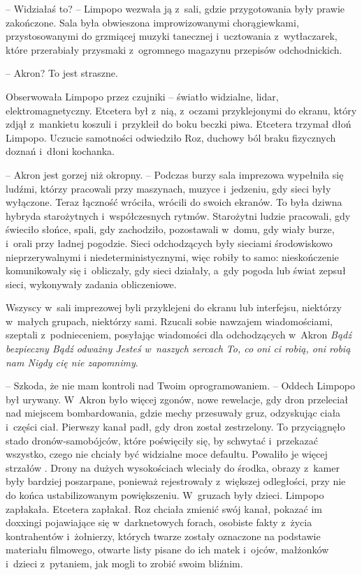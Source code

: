\documentclass[oneside,polish,11pt,sfheadings]{mwbk}
\begin{document}
-- Widziałaś to? -- Limpopo wezwała ją z~sali, gdzie przygotowania były
prawie zakończone. Sala była obwieszona improwizowanymi chorągiewkami,
przystosowanymi do grzmiącej muzyki tanecznej i~ucztowania z~wytłaczarek, które przerabiały przysmaki z~ogromnego magazynu przepisów
odchodnickich.

-- Akron? To jest straszne.

Obserwowała Limpopo przez czujniki -- światło widzialne, lidar,
elektromagnetyczny. Etcetera był z~nią, z~oczami przyklejonymi do
ekranu, który zdjął z~mankietu koszuli i~przykleił do boku beczki piwa.
Etcetera trzymał dłoń Limpopo. Uczucie samotności odwiedziło Roz,
duchowy ból braku fizycznych doznań i~dłoni kochanka.

-- Akron jest gorzej niż okropny. -- Podczas burzy sala imprezowa
wypełniła się ludźmi, którzy pracowali przy maszynach, muzyce i~jedzeniu, gdy sieci były wyłączone. Teraz łączność wróciła, wrócili do
swoich ekranów. To była dziwna hybryda starożytnych i~współczesnych
rytmów. Starożytni ludzie pracowali, gdy świeciło słońce, spali, gdy
zachodziło, pozostawali w~domu, gdy wiały burze, i~orali przy ładnej
pogodzie. Sieci odchodzących były sieciami środowiskowo nieprzerywalnymi
i niedeterministycznymi, więc robiły to samo: nieskończenie komunikowały
się i~obliczały, gdy sieci działały, a~gdy pogoda lub świat zepsuł
sieci, wykonywały zadania obliczeniowe.

Wszyscy w~sali imprezowej byli przyklejeni do ekranu lub interfejsu,
niektórzy w~małych grupach, niektórzy sami. Rzucali sobie nawzajem
wiadomościami, szeptali z~podnieceniem, posyłając wiadomości dla
odchodzących w~Akron \textit{Bądź bezpieczny Bądź odważny Jesteś w~naszych
sercach To, co oni ci robią, oni robią nam Nigdy cię nie zapomnimy}.

-- Szkoda, że nie mam kontroli nad Twoim oprogramowaniem. -- Oddech
Limpopo był urywany. W~Akron było więcej zgonów, nowe rewelacje, gdy
dron przeleciał nad miejscem bombardowania, gdzie mechy przesuwały gruz,
odzyskując ciała i~części ciał. Pierwszy kanał padł, gdy dron został
zestrzelony. To przyciągnęło stado dronów-samobójców, które poświęciły
się, by schwytać i~przekazać wszystko, czego nie chciały być widzialne
moce defaultu. Powaliło je więcej strzałów . Drony na dużych
wysokościach wleciały do środka, obrazy z~kamer były bardziej
poszarpane, ponieważ rejestrowały z~większej odległości, przy nie do
końca ustabilizowanym powiększeniu. W~gruzach były dzieci. Limpopo
zapłakała. Etcetera zapłakał. Roz chciała zmienić swój kanał, pokazać im
doxxingi pojawiające się w~darknetowych forach, osobiste fakty z~życia
kontrahentów i~żołnierzy, których twarze zostały oznaczone na podstawie
materiału filmowego, otwarte listy pisane do ich matek i~ojców,
małżonków i~dzieci z~pytaniem, jak mogli to zrobić swoim bliźnim.
\end{document}
